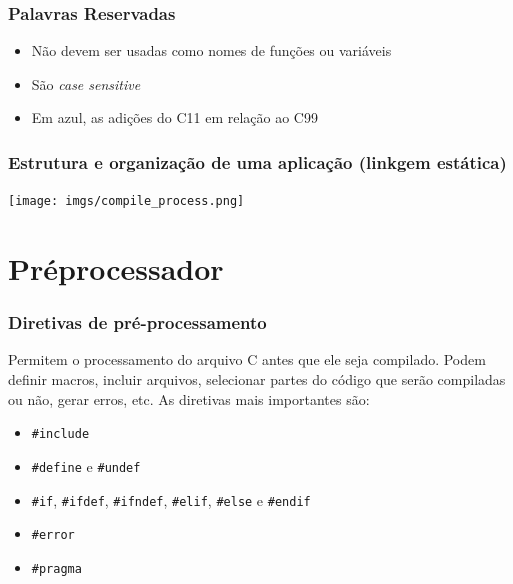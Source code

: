 \documentclass{beamer}
\begin{document}
\begin{frame}
	\frametitle{Palavras Reservadas}
	\begin{itemize}
	\item Não devem ser usadas como nomes de funções ou variáveis
	\item São \textit{case sensitive}
	\item Em azul, as adições do C11 em relação ao C99
\end{itemize}
\vspace*{0.5cm}
\end{frame}


\begin{frame}
	\frametitle{Estrutura e organização de uma aplicação (linkgem estática)}
		\texttt{[image: imgs/compile\_process.png]}
\end{frame}

\section{Préprocessador}

\begin{frame}
	\frametitle{Diretivas de pré-processamento}
	Permitem o processamento do arquivo C antes que ele seja compilado. Podem definir macros, incluir arquivos, selecionar partes do código que serão compiladas ou não, gerar erros, etc. As diretivas mais importantes são:
\vspace*{0.5cm}
\begin{itemize}
	\item \texttt{\#include}
	\item \texttt{\#define} e \texttt{\#undef}
	\item \texttt{\#if}, \texttt{\#ifdef}, \texttt{\#ifndef}, \texttt{\#elif}, \texttt{\#else} e \texttt{\#endif}
	\item \texttt{\#error}
	\item \texttt{\#pragma}
\end{itemize}
\end{frame}
\end{document}
